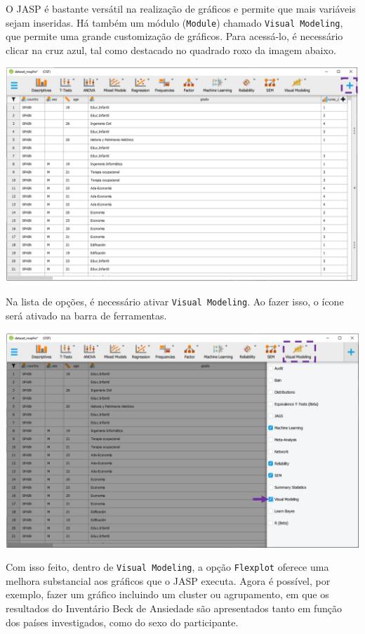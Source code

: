 \documentclass[
]{book}
\begin{document}
O JASP é bastante versátil na realização de gráficos e permite que mais variáveis sejam inseridas. Há também um módulo (\texttt{Module}) chamado \texttt{Visual\ Modeling}, que permite uma grande customização de gráficos. Para acessá-lo, é necessário clicar na cruz azul, tal como destacado no quadrado roxo da imagem abaixo.

\includegraphics{./img/cap_desc_jasp_modules.png}

Na lista de opções, é necessário ativar \texttt{Visual\ Modeling}. Ao fazer isso, o ícone será ativado na barra de ferramentas.

\includegraphics{./img/cap_desc_jasp_visual_modeling.png}

Com isso feito, dentro de \texttt{Visual\ Modeling}, a opção \texttt{Flexplot} oferece uma melhora substancial aos gráficos que o JASP executa. Agora é possível, por exemplo, fazer um gráfico incluindo um cluster ou agrupamento, em que os resultados do Inventário Beck de Ansiedade são apresentados tanto em função dos países investigados, como do sexo do participante.
\end{document}

